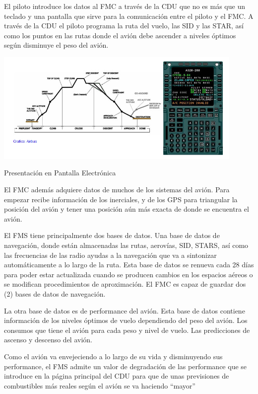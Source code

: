 \begin{frame}


El piloto introduce los datos al \ac{FMC} a trav\'es de la \ac{CDU} que no es m\'as que un teclado 
y una pantalla que sirve para la comunicaci\'on entre el piloto y el \ac{FMC}. 
A trav\'es de la \ac{CDU} el piloto programa la ruta del vuelo, las \ac{SID}  
y las \ac{STAR}, as\'i como los puntos en las rutas donde el avi\'on debe ascender 
a niveles \'optimos seg\'un disminuye el peso del avi\'on.

    \includegraphics[width=0.9\textwidth]{imagenes/1.4.pantalla.electronica/fms_plan_vuelo.jpg}
  \end{frame}
  

\begin{frame}{Presentaci\'on en Pantalla Electr\'onica}
{\small
El \ac{FMC} adem\'as adquiere datos de muchos de los sistemas del avi\'on. Para empezar recibe informaci\'on de los inerciales, y de los \ac{GPS} para triangular la posici\'on del avi\'on y tener una posici\'on a\'un m\'as exacta de donde se encuentra el avi\'on.

El \ac{FMS} tiene principalmente dos bases de datos. Una base de datos de navegaci\'on, donde est\'an almacenadas las rutas, aerov\'ias, \ac{SID}, \ac{STARS}, as\'i como las frecuencias de las radio ayudas a la navegaci\'on que va a sintonizar autom\'aticamente a lo largo de la ruta. Esta base de datos se renueva cada 28 d\'ias para poder estar actualizada cuando se producen cambios en los espacios a\'ereos o se modifican procedimientos de aproximaci\'on. 
El \ac{FMC} es capaz de guardar dos (2)  bases de datos de navegaci\'on.

La otra base de datos es de performance del avi\'on. Esta base de datos contiene informaci\'on de los niveles \'optimos de vuelo dependiendo del peso del avi\'on. Los consumos que tiene el avi\'on para cada peso y nivel de vuelo. Las predicciones de ascenso y descenso del avi\'on.

Como el avi\'on va envejeciendo a lo largo de su vida y disminuyendo sus performance, el \ac{FMS} admite un valor de degradaci\'on de las performance que se introduce en la p\'agina principal del \ac{CDU} para que de unas previsiones de combustibles m\'as reales seg\'un el avi\'on se va haciendo ``mayor''
}
\end{frame}


